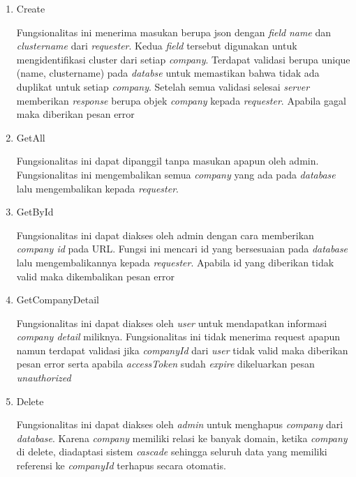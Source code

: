 \begin{enumerate}
  \item Create

        Fungsionalitas ini menerima masukan berupa json dengan \textit{field} \textit{name} dan \textit{cluster\textunderscore name} dari \textit{requester}. Kedua \textit{field} tersebut digunakan untuk mengidentifikasi cluster dari setiap \textit{company}. Terdapat validasi berupa unique (name, cluster\textunderscore name) pada \textit{databse} untuk memastikan bahwa tidak ada duplikat untuk setiap \textit{company}. Setelah semua validasi selesai \textit{server} memberikan \textit{response} berupa objek \textit{company} kepada \textit{requester}. Apabila gagal maka diberikan pesan error

  \item GetAll

        Fungsionalitas ini dapat dipanggil tanpa masukan apapun oleh admin. Fungsionalitas ini mengembalikan semua \textit{company} yang ada pada \textit{database} lalu mengembalikan kepada \textit{requester}.

  \item GetById

        Fungsionalitas ini dapat diakses oleh admin dengan cara memberikan \textit{company id} pada URL. Fungsi ini mencari id yang bersesuaian pada \textit{database} lalu mengembalikannya kepada \textit{requester}. Apabila id yang diberikan tidak valid maka dikembalikan pesan error

  \item GetCompanyDetail

        Fungsionalitas ini dapat diakses oleh \textit{user} untuk mendapatkan informasi \textit{company detail} miliknya. Fungsionalitas ini tidak menerima request apapun namun terdapat validasi jika \textit{companyId} dari \textit{user} tidak valid maka diberikan pesan error serta apabila \textit{accessToken} sudah \textit{expire} dikeluarkan pesan \textit{unauthorized}

  \item Delete

        Fungsionalitas ini dapat diakses oleh \textit{admin} untuk menghapus \textit{company} dari \textit{database}. Karena \textit{company} memiliki relasi ke banyak domain, ketika \textit{company} di delete, diadaptasi sistem \textit{cascade} sehingga seluruh data yang memiliki referensi ke \textit{companyId} terhapus secara otomatis.

\end{enumerate}


